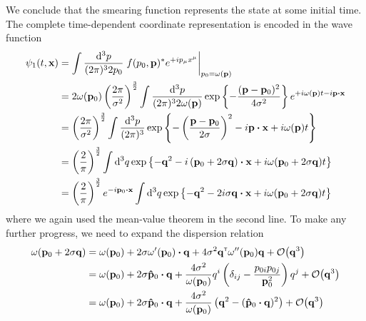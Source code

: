 \begin{example}
	We conclude that the smearing function represents the state at some initial time.
	The complete time-dependent coordinate representation is encoded in the wave function
	\begin{equation*}
		\begin{split}
			\psi_1(t,\vb{x})
			&=
			\int\frac{\dd[3]{p}}{(2\pi)^32p_0}
			\eval{
				f(p_0,\vb{p})^*
				e^{+ip_\mu x^\mu}
			}_{p_0=\omega(\vb{p})}
			\\
			&=
			2\omega(\vb{p}_0)
			\left(\frac{2\pi}{\sigma^2}\right)^{\frac{3}{2}}
			\int\frac{\dd[3]{p}}{(2\pi)^32\omega(\vb{p})}
			\exp\left\{
				-
				\frac{(\vb{p}-\vb{p}_0)^2}{4\sigma^2}
			\right\}
			e^{+i\omega(\vb{p})t-i\vb{p}\vdot\vb{x}}
			\\
			&=
			\left(\frac{2\pi}{\sigma^2}\right)^{\frac{3}{2}}
			\int\frac{\dd[3]{p}}{(2\pi)^3}
			\exp\left\{
				-
				\left(
					\frac{\vb{p}-\vb{p}_0}{2\sigma}
				\right)^2
				-
				i\vb{p}\vdot\vb{x}
				+
				i\omega(\vb{p})t
			\right\}
			\\
			&=
			\left(\frac{2}{\pi}\right)^{\frac{3}{2}}
			\int\dd[3]{q}
			\exp\left\{
				-
				\vb{q}^2
				-
				i\left(\vb{p}_0+2\sigma\vb{q}\right)\vdot\vb{x}
				+
				i\omega(\vb{p}_0+2\sigma\vb{q})t
			\right\}
			\\
			&=
			\left(\frac{2}{\pi}\right)^{\frac{3}{2}}
			e^{-i\vb{p}_0\vdot\vb{x}}
			\int\dd[3]{q}
			\exp\left\{
				-
				\vb{q}^2
				-
				2i\sigma
				\vb{q}\vdot\vb{x}
				+
				i\omega(\vb{p}_0+2\sigma\vb{q})t
			\right\}
		\end{split}
	\end{equation*}
	where we again used the mean-value theorem in the second line.
	To make any further progress, we need to expand the dispersion relation
	\begin{equation*}
		\begin{split}
			\omega(\vb{p}_0+2\sigma\vb{q})
			&=
			\omega(\vb{p}_0)
			+
			2\sigma\omega^\prime(\vb{p}_0)\vdot\vb{q}
			+
			4\sigma^2
			\vb{q}^\trans
			\omega^{\prime\prime}(\vb{p}_0)
			\vb{q}
			+
			\order{\vb{q}^3}
			\\
			&=
			\omega(\vb{p}_0)
			+
			2\sigma\vu{p}_0\vdot\vb{q}
			+
			\frac{4\sigma^2}{\omega(\vb{p}_0)}
			q^i
			\left(\delta_{ij}-\frac{p_{0i}p_{0j}}{\vb{p}_0^2}\right)
			q^j
			+
			\order{\vb{q}^3}
			\\
			&=
			\omega(\vb{p}_0)
			+
			2\sigma\vu{p}_0\vdot\vb{q}
			+
			\frac{4\sigma^2}{\omega(\vb{p}_0)}
			\left(
				\vb{q}^2
				-
				(\vu{p}_0\vdot\vb{q})^2
			\right)
			+
			\order{\vb{q}^3}

\end{split}
\end{equation*}
\end{example}
